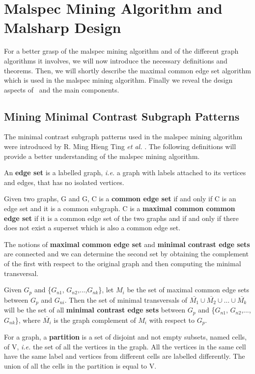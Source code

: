 \chapter{Malspec Mining Algorithm and Malsharp Design}
\label{chapter:third}

For a better grasp of the malspec mining algorithm and of the different graph algorithms it involves, we will now introduce the necessary definitions and theorems. Then, we will shortly describe the maximal common edge set algorithm which is used in the malspec mining algorithm. Finally we reveal the design aspects of \project\ and the main components.

\section{Mining Minimal Contrast Subgraph Patterns}
\label{third:graph-defs}

The minimal contrast subgraph patterns used in the malspec mining algorithm were introduced by R. Ming Hieng Ting \textit{et al.} \cite{minimal-contrast-subgraph}. The following definitions will provide a better understanding of the malspec mining algorithm.

An \textbf{edge set} is a labelled graph, \textit{i.e.} a graph with labels attached to its vertices and edges, that has no isolated vertices.

Given two graphs, G and G, C is a \textbf{common edge set} if and only if C is an edge set and it is a common subgraph. C is a \textbf{maximal common common edge set} if it is a common edge set of the two graphs and if and only if there does not exist a superset which is also a common edge set.

The notions of \textbf{maximal common edge set} and \textbf{minimal contrast edge sets} are connected and we can determine the second set by obtaining the complement of the first with respect to the original graph and then computing the minimal transversal.

Given $G_{p}$ and \{$G_{n1}$, $G_{n2}$,...,$G_{nk}$\}, let $M_{i}$ be the set of maximal common edge sets between $G_{p}$ and $G_{ni}$. Then the set of minimal transversals of $\bar{M_{1}} \cup \bar{M_{2}} \cup ... \cup \bar{M_{k}}$ will be the set of all \textbf{minimal contrast edge sets} between $G_{p}$ and \{$G_{n1}$, $G_{n2}$,...,$G_{nk}$\}, where $\bar{M_{i}}$ is the graph complement of $M_{i}$ with respect to $G_{p}$.

For a graph, a \textbf{partition} is a set of disjoint and not empty subsets, named cells, of V, \textit{i.e.} the set of all the vertices in the graph. All the vertices in the same cell have the same label and vertices from different cells are labelled differently. The union of all the cells in the partition is equal to V.

